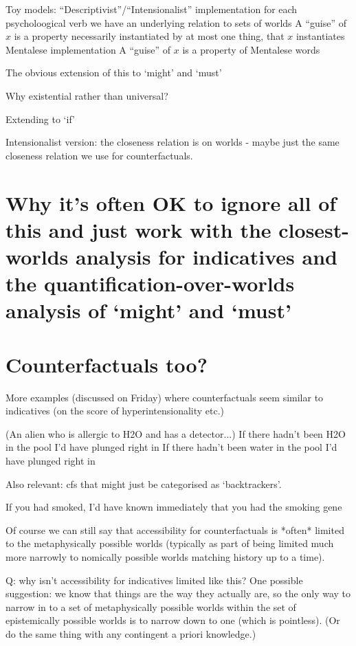 \documentclass[If.tex]{subfiles}
\begin{document}
Toy models: 
	“Descriptivist”/“Intensionalist” implementation
		for each psycholoogical verb we have an underlying relation to sets of worlds
		A “guise” of $x$ is a property necessarily instantiated by at most one thing, that $x$ instantiates
	Mentalese implementation
		A “guise” of $x$ is a property of Mentalese words

The obvious extension of this to ‘might’ and ‘must’

Why existential rather than universal?  

Extending to ‘if’

Intensionalist version: the closeness relation is on worlds - maybe just the same closeness relation we use for counterfactuals.  


\section{Why it's often OK to ignore all of this and just work with the closest-worlds analysis for indicatives and the quantification-over-worlds analysis of ‘might’ and ‘must’}



\section{Counterfactuals too?}
More examples (discussed on Friday) where counterfactuals seem similar to indicatives (on the score of hyperintensionality etc.)

(An alien who is allergic to H2O and has a detector...)
If there hadn't been H2O in the pool I'd have plunged right in
If there hadn't been water in the pool I'd have plunged right in

Also relevant: cfs that might just be categorised as ‘backtrackers’.  

If you had smoked, I'd have known immediately that you had the smoking gene

Of course we can still say that accessibility for counterfactuals is *often* limited to the metaphysically possible worlds (typically as part of being limited much more narrowly to nomically possible worlds matching history up to a time).  

Q: why isn't accessibility for indicatives limited like this?  One possible suggestion: we know that things are the way they actually are, so the only way to narrow in to a set of metaphysically possible worlds within the set of epistemically possible worlds is to narrow down to one (which is pointless).  (Or do the same thing with any contingent a priori knowledge.)
\end{document}
